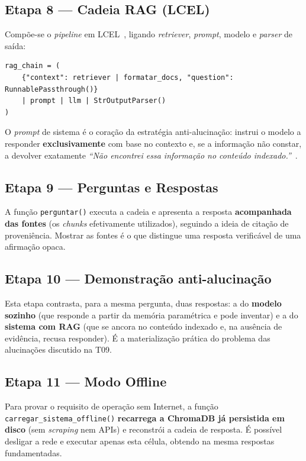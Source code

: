 \documentclass[]{ceurart}
\begin{document}
\subsection*{Etapa 8 --- Cadeia RAG (LCEL)}

Compõe-se o \emph{pipeline} em LCEL~\cite{langchain}, ligando \emph{retriever},
\emph{prompt}, modelo e \emph{parser} de saída:

\begin{lstlisting}
rag_chain = (
    {"context": retriever | formatar_docs, "question": RunnablePassthrough()}
    | prompt | llm | StrOutputParser()
)
\end{lstlisting}

O \emph{prompt} de sistema é o coração da estratégia anti-alucinação: instrui o
modelo a responder \textbf{exclusivamente} com base no contexto e, se a
informação não constar, a devolver exatamente \emph{``Não encontrei essa
informação no conteúdo indexado.''}~\cite{ji2023hallucination}.

\subsection*{Etapa 9 --- Perguntas e Respostas}

A função \texttt{perguntar()} executa a cadeia e apresenta a resposta
\textbf{acompanhada das fontes} (os \emph{chunks} efetivamente utilizados),
seguindo a ideia de citação de proveniência. Mostrar as fontes é o que distingue
uma resposta verificável de uma afirmação opaca.

\subsection*{Etapa 10 --- Demonstração anti-alucinação}

Esta etapa contrasta, para a mesma pergunta, duas respostas: a do \textbf{modelo
sozinho} (que responde a partir da memória paramétrica e pode inventar) e a do
\textbf{sistema com RAG} (que se ancora no conteúdo indexado e, na ausência de
evidência, recusa responder). É a materialização prática do problema das
alucinações discutido na T09.

\subsection*{Etapa 11 --- Modo Offline}

Para provar o requisito de operação sem Internet, a função
\texttt{carregar\_sistema\_offline()} \textbf{recarrega a ChromaDB já persistida
em disco} (sem \emph{scraping} nem APIs) e reconstrói a cadeia de resposta. É
possível desligar a rede e executar apenas esta célula, obtendo na mesma
respostas fundamentadas.
\end{document}

